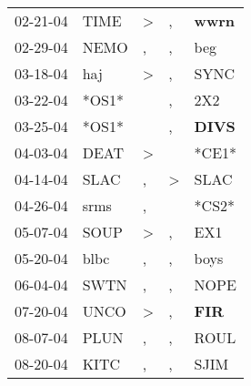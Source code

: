 \begin{supertabular}{p{0.07\textwidth}p{0.06\textwidth}p{0.02\textwidth}p{0.02\textwidth}p{0.06\textwidth}}
          02-21-04\textsuperscript{} &           TIME\textsuperscript{} &     \textgreater &                , &  \textbf{wwrn\textsuperscript{}} \\
          02-29-04\textsuperscript{} &           NEMO\textsuperscript{} &                , &                , &            beg\textsuperscript{} \\
          03-18-04\textsuperscript{} &            haj\textsuperscript{} &     \textgreater &                , &           SYNC\textsuperscript{} \\
          03-22-04\textsuperscript{} &                            *OS1* &                  &                , &            2X2\textsuperscript{} \\
          03-25-04\textsuperscript{} &                            *OS1* &                  &                , &  \textbf{DIVS\textsuperscript{}} \\
          04-03-04\textsuperscript{} &           DEAT\textsuperscript{} &     \textgreater &                  &                            *CE1* \\
          04-14-04\textsuperscript{} &           SLAC\textsuperscript{} &                , &     \textgreater &           SLAC\textsuperscript{} \\
          04-26-04\textsuperscript{} &           srms\textsuperscript{} &                , &                  &                            *CS2* \\
          05-07-04\textsuperscript{} &           SOUP\textsuperscript{} &     \textgreater &                , &            EX1\textsuperscript{} \\
          05-20-04\textsuperscript{} &           blbc\textsuperscript{} &                , &                , &           boys\textsuperscript{} \\
          06-04-04\textsuperscript{} &           SWTN\textsuperscript{} &                , &                , &           NOPE\textsuperscript{} \\
          07-20-04\textsuperscript{} &           UNCO\textsuperscript{} &     \textgreater &                , &   \textbf{FIR\textsuperscript{}} \\
          08-07-04\textsuperscript{} &           PLUN\textsuperscript{} &                , &                , &           ROUL\textsuperscript{} \\
          08-20-04\textsuperscript{} &           KITC\textsuperscript{} &                , &                , &           SJIM\textsuperscript{} \\

\end{supertabular}
